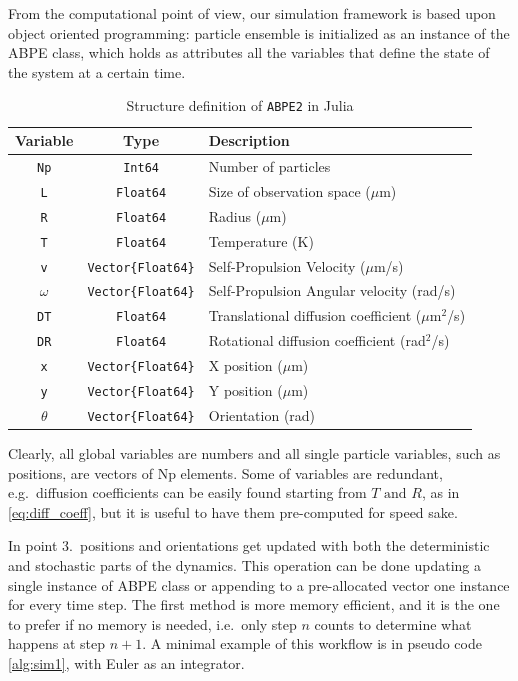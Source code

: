 \documentclass[../../master_thesis_np.tex]{subfiles}
\begin{document}
	From the computational point of view, our simulation framework is based upon object oriented programming: particle ensemble is initialized as an instance of the ABPE class, which holds as attributes all the variables that define the state of the system at a certain time. 
	\begin{table}[h]
		\centering
		\begin{tabular}{c|cl}
			\textbf{Variable} & \textbf{Type} & \textbf{Description} \\
			\hline
			\texttt{Np}  & \texttt{Int64} & Number of particles \\
			\texttt{L}   & \texttt{Float64} & Size of observation space ($\mu$m) \\
			\texttt{R}   & \texttt{Float64} & Radius ($\mu$m) \\
			\texttt{T}   & \texttt{Float64} & Temperature (K) \\
			\texttt{v}   & \texttt{Vector\{Float64\}} & Self-Propulsion Velocity ($\mu$m/s) \\
			\texttt{$\mathtt{\omega}$}   & \texttt{Vector\{Float64\}} & Self-Propulsion Angular velocity (rad/s) \\
			\texttt{DT}  & \texttt{Float64} & Translational diffusion coefficient ($\mu$m$^2$/s) \\
			\texttt{DR}  & \texttt{Float64} & Rotational diffusion coefficient (rad$^2$/s) \\
			\texttt{x}   & \texttt{Vector\{Float64\}} & X position ($\mu$m) \\
			\texttt{y}   & \texttt{Vector\{Float64\}} & Y position ($\mu$m) \\
			\texttt{$\mathtt{\theta}$}   & \texttt{Vector\{Float64\}} & Orientation (rad) \\
		\end{tabular}
		\caption{Structure definition of \texttt{ABPE2} in Julia}
		\label{tab:ABPE2}
	\end{table}
	Clearly, all global variables are numbers and all single particle variables, such as positions, are vectors of Np elements. Some of variables are redundant, e.g.\ diffusion coefficients can be easily found starting from $T\text{ and } R$, as in \ref{eq:diff_coeff}, but it is useful to have them pre-computed for speed sake.
	
	In point 3.\ positions and orientations get updated with both the deterministic and stochastic parts of the dynamics. This operation can be done updating a single instance of ABPE class or appending to a pre-allocated vector one instance for every time step. The first method is more memory efficient, and it is the one to prefer if no memory is needed, i.e.\ only step $n$ counts to determine what happens at step $n+1$. A minimal example of this workflow is in pseudo code \ref{alg:sim1}, with Euler as an integrator.
	
\end{document}
